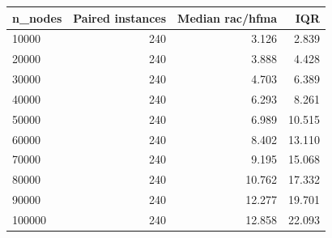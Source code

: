 \begin{tabular}{lrrr}
\toprule
n\_nodes & Paired instances & Median rac/hfma & IQR \\
\midrule
10000 & 240 & 3.126 & 2.839 \\
20000 & 240 & 3.888 & 4.428 \\
30000 & 240 & 4.703 & 6.389 \\
40000 & 240 & 6.293 & 8.261 \\
50000 & 240 & 6.989 & 10.515 \\
60000 & 240 & 8.402 & 13.110 \\
70000 & 240 & 9.195 & 15.068 \\
80000 & 240 & 10.762 & 17.332 \\
90000 & 240 & 12.277 & 19.701 \\
100000 & 240 & 12.858 & 22.093 \\
\bottomrule
\end{tabular}
